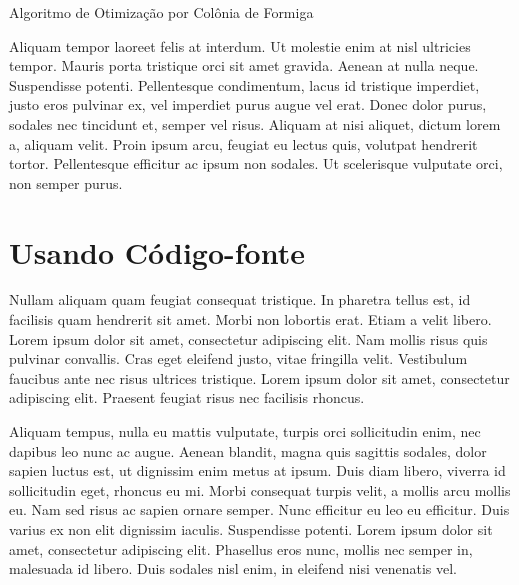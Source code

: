 \begin{algorithm}[ht!]
	\SetSpacedAlgorithm
	\caption{\label{alg:algoritmo_de_colonica_de_formigas}Algoritmo de Otimização por Colônia de Formiga}
\end{algorithm}

Aliquam tempor laoreet felis at interdum. Ut molestie enim at nisl ultricies tempor. Mauris porta tristique orci sit amet gravida. Aenean at nulla neque. Suspendisse potenti. Pellentesque condimentum, lacus id tristique imperdiet, justo eros pulvinar ex, vel imperdiet purus augue vel erat. Donec dolor purus, sodales nec tincidunt et, semper vel risus. Aliquam at nisi aliquet, dictum lorem a, aliquam velit. Proin ipsum arcu, feugiat eu lectus quis, volutpat hendrerit tortor. Pellentesque efficitur ac ipsum non sodales. Ut scelerisque vulputate orci, non semper purus.

\section{Usando Código-fonte}

Nullam aliquam quam feugiat consequat tristique. In pharetra tellus est, id facilisis quam hendrerit sit amet. Morbi non lobortis erat. Etiam a velit libero. Lorem ipsum dolor sit amet, consectetur adipiscing elit. Nam mollis risus quis pulvinar convallis. Cras eget eleifend justo, vitae fringilla velit. Vestibulum faucibus ante nec risus ultrices tristique. Lorem ipsum dolor sit amet, consectetur adipiscing elit. Praesent feugiat risus nec facilisis rhoncus.



Aliquam tempus, nulla eu mattis vulputate, turpis orci sollicitudin enim, nec dapibus leo nunc ac augue. Aenean blandit, magna quis sagittis sodales, dolor sapien luctus est, ut dignissim enim metus at ipsum. Duis diam libero, viverra id sollicitudin eget, rhoncus eu mi. Morbi consequat turpis velit, a mollis arcu mollis eu. Nam sed risus ac sapien ornare semper. Nunc efficitur eu leo eu efficitur. Duis varius ex non elit dignissim iaculis. Suspendisse potenti. Lorem ipsum dolor sit amet, consectetur adipiscing elit. Phasellus eros nunc, mollis nec semper in, malesuada id libero. Duis sodales nisl enim, in eleifend nisi venenatis vel.

